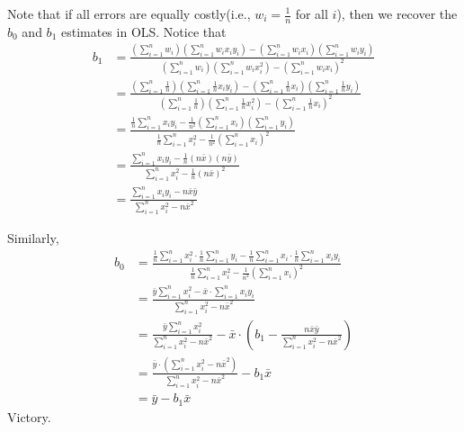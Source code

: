 \documentclass[12pt]{article}
\begin{document}
\begin{enumerate}
Note that if all errors are equally costly(i.e., $w_i=\frac{1}{n}$ for all $i$), then we recover the $b_0$ and $b_1$ estimates in OLS. Notice that
\begin{align*}
	b_1 
	&= \frac{\left(\sum_{i=1}^{n}w_i\right)\left(\sum_{i=1}^{n}w_ix_iy_i\right)-\left(\sum_{i=1}^{n}w_ix_i\right)\left(\sum_{i=1}^{n}w_iy_i\right)}
	{\left(\sum_{i=1}^{n}w_i\right)\left(\sum_{i=1}^{n}w_ix_i^2\right)-\left(\sum_{i=1}^{n}w_ix_i\right)^2}\\
	&= \frac{\left(\sum_{i=1}^{n}\frac{1}{n}\right)\left(\sum_{i=1}^{n}\frac{1}{n}x_iy_i\right)-\left(\sum_{i=1}^{n}\frac{1}{n}x_i\right)\left(\sum_{i=1}^{n}\frac{1}{n}y_i\right)}
	{\left(\sum_{i=1}^{n}\frac{1}{n}\right)\left(\sum_{i=1}^{n}\frac{1}{n}x_i^2\right)-\left(\sum_{i=1}^{n}\frac{1}{n}x_i\right)^2}\\
	&=\frac{\frac{1}{n}\sum_{i=1}^{n}x_iy_i-\frac{1}{n^2}\left(\sum_{i=1}^{n}x_i\right)\left(\sum_{i=1}^{n}y_i\right)}{\frac{1}{n}\sum_{i=1}^{n}x_i^2-\frac{1}{n^2}\left(\sum_{i=1}^{n}x_i\right)^2}\\
	&=\frac{\sum_{i=1}^{n}x_iy_i-\frac{1}{n}(n\bar{x})(n\bar{y})}{\sum_{i=1}^{n}x_i^2-\frac{1}{n}(n\bar{x})^2}\\
	&=\frac{\sum_{i=1}^{n}x_iy_i - n\bar{x}\bar{y}}{\sum_{i=1}^{n}x_i^2-n\bar{x}^2}
\end{align*}

Similarly,
\begin{align*}
	b_0 &= \frac{\frac{1}{n}\sum_{i=1}^{n}x_i^2\cdot \frac{1}{n}\sum_{i=1}^{n}y_i-\frac{1}{n}\sum_{i=1}^{n}x_i\cdot \frac{1}{n}\sum_{i=1}^{n}x_iy_i}{\frac{1}{n}\sum_{i=1}^{n}x_i^2-\frac{1}{n^2}\left(\sum_{i=1}^{n}x_i\right)^2}\\
	&=\frac{\bar{y}\sum_{i=1}^{n}x_i^2-\bar{x}\cdot \sum_{i=1}^{n}x_iy_i}{\sum_{i=1}^{n}x_i^2-n\bar{x}^2}\\
	&=\frac{\bar{y}\sum_{i=1}^{n}x_i^2}{\sum_{i=1}^{n}x_i^2-n\bar{x}^2}
	-\bar{x}\cdot \left(b_1 - \frac{n\bar{x}\bar{y}}{\sum_{i=1}^{n}x_i^2-n\bar{x}^2}\right)\\
	&=\frac{\bar{y}\cdot \left(\sum_{i=1}^{n}x_i^2-n\bar{x}^2\right)}{\sum_{i=1}^{n}x_i^2-n\bar{x}^2} - b_1\bar{x}\\
	&=\bar{y}-b_1\bar{x}
\end{align*}
Victory.



\end{enumerate}
\end{document}
